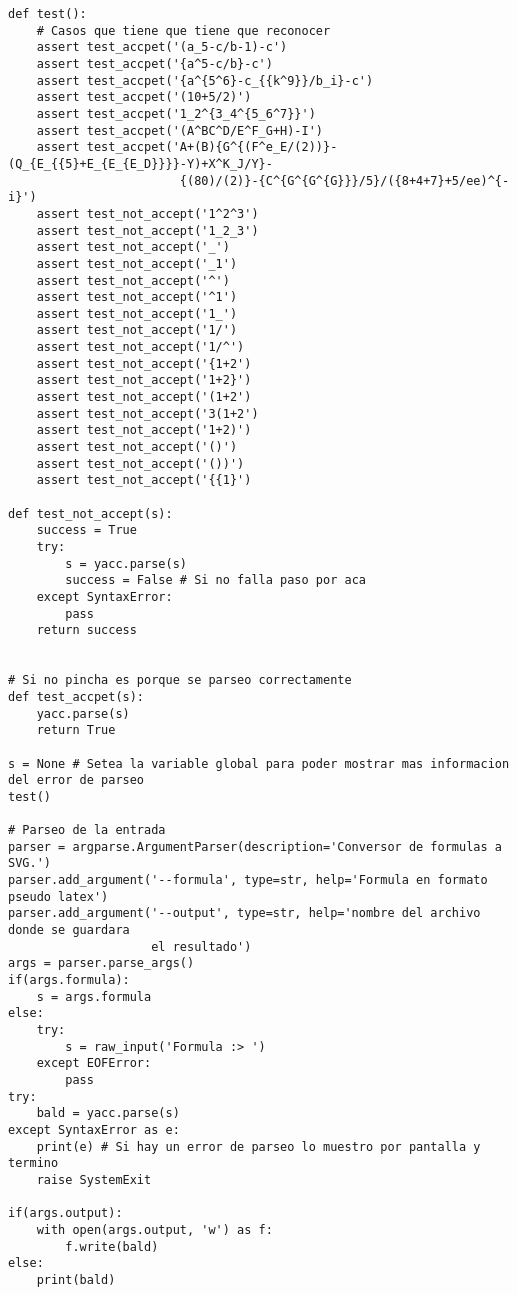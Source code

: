 \begin{verbatim}
def test():
    # Casos que tiene que tiene que reconocer
    assert test_accpet('(a_5-c/b-1)-c')
    assert test_accpet('{a^5-c/b}-c')
    assert test_accpet('{a^{5^6}-c_{{k^9}}/b_i}-c')
    assert test_accpet('(10+5/2)')
    assert test_accpet('1_2^{3_4^{5_6^7}}')
    assert test_accpet('(A^BC^D/E^F_G+H)-I')
    assert test_accpet('A+(B){G^{(F^e_E/(2))}-(Q_{E_{{5}+E_{E_{E_D}}}}-Y)+X^K_J/Y}-
    					{(80)/(2)}-{C^{G^{G^{G}}}/5}/({8+4+7}+5/ee)^{-i}')
    assert test_not_accept('1^2^3')
    assert test_not_accept('1_2_3')
    assert test_not_accept('_')
    assert test_not_accept('_1')
    assert test_not_accept('^')
    assert test_not_accept('^1')
    assert test_not_accept('1_')
    assert test_not_accept('1/')
    assert test_not_accept('1/^')
    assert test_not_accept('{1+2')
    assert test_not_accept('1+2}')
    assert test_not_accept('(1+2')
    assert test_not_accept('3(1+2')
    assert test_not_accept('1+2)')
    assert test_not_accept('()')
    assert test_not_accept('())')
    assert test_not_accept('{{1}')
		
def test_not_accept(s):
    success = True
    try:
        s = yacc.parse(s)
        success = False # Si no falla paso por aca
    except SyntaxError:
        pass
    return success


# Si no pincha es porque se parseo correctamente
def test_accpet(s):
    yacc.parse(s)
    return True

s = None # Setea la variable global para poder mostrar mas informacion del error de parseo
test()

# Parseo de la entrada
parser = argparse.ArgumentParser(description='Conversor de formulas a SVG.')
parser.add_argument('--formula', type=str, help='Formula en formato pseudo latex')
parser.add_argument('--output', type=str, help='nombre del archivo donde se guardara 
					el resultado')
args = parser.parse_args()
if(args.formula):
    s = args.formula
else:
    try:
        s = raw_input('Formula :> ')
    except EOFError:
        pass
try:
    bald = yacc.parse(s)
except SyntaxError as e:
    print(e) # Si hay un error de parseo lo muestro por pantalla y termino
    raise SystemExit

if(args.output):
    with open(args.output, 'w') as f:
    	f.write(bald)
else:
    print(bald)
\end{verbatim}

\newpage


